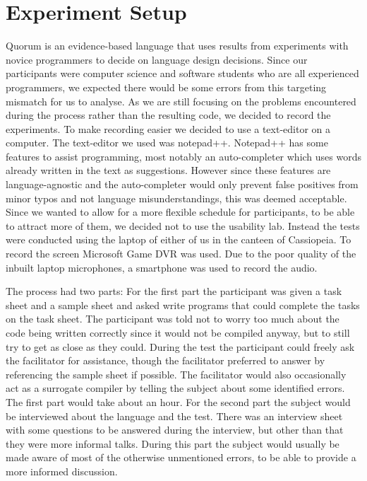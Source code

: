 \chapter{Experiment Setup}
Quorum is an evidence-based language that uses results from experiments with novice programmers to decide on language design decisions.
Since our participants were computer science and software students who are all experienced programmers, we expected there would be some errors from this targeting mismatch for us to analyse.
As we are still focusing on the problems encountered during the process rather than the resulting code, we decided to record the experiments.
To make recording easier we decided to use a text-editor on a computer.
The text-editor we used was notepad++\cite{Notepad}.
Notepad++ has some features to assist programming, most notably an auto-completer which uses words already written in the text as suggestions.
However since these features are language-agnostic and the auto-completer would only prevent false positives from minor typos and not language misunderstandings, this was deemed acceptable.%
Since we wanted to allow for a more flexible schedule for participants, to be able to attract more of them, we decided not to use the usability lab.
Instead the tests were conducted using the laptop of either of us in the canteen of Cassiopeia.
To record the screen Microsoft Game DVR was used.
Due to the poor quality of the inbuilt laptop microphones, a smartphone was used to record the audio.%

The process had two parts:
For the first part the participant was given a task sheet and a sample sheet and asked write programs that could complete the tasks on the task sheet.
The participant was told not to worry too much about the code being written correctly since it would not be compiled anyway, but to still try to get as close as they could.
During the test the participant could freely ask the facilitator for assistance, though the facilitator preferred to answer by referencing the sample sheet if possible.
The facilitator would also occasionally act as a surrogate compiler by telling the subject about some identified errors.%
The first part would take about an hour.
For the second part the subject would be interviewed about the language and the test.
There was an interview sheet with some questions to be answered during the interview, but other than that they were more informal talks.
During this part the subject would usually be made aware of most of the otherwise unmentioned errors, to be able to provide a more informed discussion.


